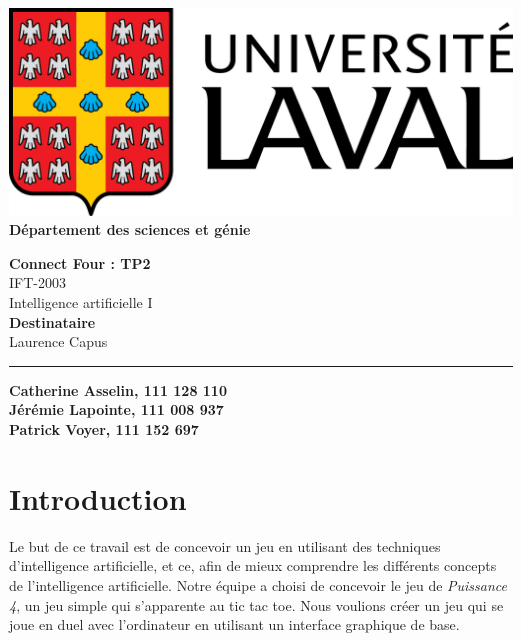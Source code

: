 \documentclass[12pt]{article}
\begin{document}
\begin{titlepage}
	\begin{minipage}{0.5\textwidth}
		\begin{flushleft}
			\includegraphics[scale=0.1]{logo.png} \\
			\textbf{Département des sciences et génie}
		\end{flushleft}
	\end{minipage}
	\vspace{150px}
	\begin{center} \large
		\textbf{Connect Four : TP2} \\
		IFT-2003 \\
		Intelligence artificielle I \\
		\vspace{150px}
		\textbf{Destinataire} \\
		Laurence Capus
	\end{center}
	\vfill
	\rule{\linewidth}{.5pt}
	\newline
	\textbf{Catherine Asselin, 111 128 110} \\
	\textbf{Jérémie Lapointe, 111 008 937} \\
	\textbf{Patrick Voyer, 111 152 697}
\end{titlepage}

\newpage
\setcounter{page}{1}

\section*{Introduction}
Le but de ce travail est de concevoir un jeu en utilisant des techniques d'intelligence artificielle, et ce, afin de mieux comprendre les différents concepts de l'intelligence artificielle. Notre équipe a choisi de concevoir le jeu de \textit{Puissance 4}, un jeu simple qui s'apparente au tic tac toe. Nous voulions créer un jeu qui se joue en duel avec l'ordinateur en utilisant un interface graphique de base.
\end{document}
